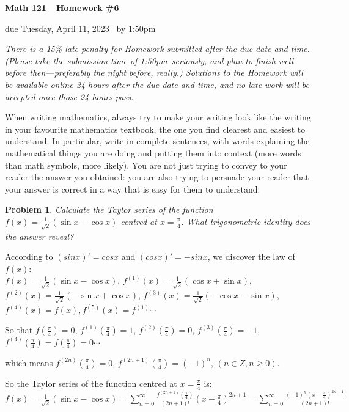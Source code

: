 \documentclass[12pt,reqno]{amsart}
\newtheorem{problem}{Problem}
\newcommand{\duetime}{1:50{\sc pm}}
\newcommand{\thisyear}{2023}
\begin{document}
\centerline{\bf Math 121---Homework \#6}
\centerline{due
	Tuesday, April 11, \thisyear
\ by \duetime}

\medskip
{\em There is a 15\% late penalty for Homework submitted after the due date and time. (Please take the submission time of \duetime\ seriously, and plan to finish well before then---preferably the night before, really.) Solutions to the Homework will be available online 24 hours after the due date and time, and no late work will be accepted once those 24 hours pass.}

\smallskip
When writing mathematics, always try to make your writing look like the writing in your favourite mathematics textbook, the one you find clearest and easiest to understand. In particular, write in complete sentences, with words explaining the mathematical things you are doing and putting them into context (more words than math symbols, more likely). You are not just trying to convey to your reader the answer you obtained: you are also trying to persuade your reader that your answer is correct in a way that is easy for them to understand.



\medskip
\begin{problem}
Calculate the Taylor series of the function $f(x) = \frac1{\sqrt2}(\sin x - \cos x)$ centred at $x=\frac\pi4$. What trigonometric identity does the answer reveal?
\end{problem}
According to $(sinx)'=cosx$ and $(cosx)'=-sinx$, we discover the law of $f(x)$:\\
$f(x)=\frac{1}{\sqrt{2}}(\sin x-\cos x)$, $f^{(1)}(x)=\frac{1}{\sqrt{2}}(\cos x+\sin x)$,
 $f^{(2)}(x)=\frac{1}{\sqrt{2}}(-\sin x+\cos x)$, $f^{(3)}(x)=\frac{1}{\sqrt{2}}(-\cos x-\sin x)$, $f^{(4)}(x)=f(x),f^{(5)}(x)=f^{(1)}\cdots$

So that $f(\frac{\pi}{4})=0$, $f^{(1)}(\frac{\pi}{4})=1$, $f^{(2)}(\frac{\pi}{4})=0$, $f^{(3)}(\frac{\pi}{4})=-1$, $f^{(4)}(\frac{\pi}{4})=f(\frac{\pi}{4})=0\cdots$

which means $f^{(2n)}(\frac{\pi}{4})=0$, $f^{(2n+1)}(\frac{\pi}{4})=(-1)^{n}$, $(n\in Z,n\geq0)$.

So the Taylor series of the function centred at $x=\frac{\pi}{4}$ is:
\\$f(x)=\frac{1}{\sqrt{2}}(\sin x-\cos x)=\sum\limits_{n=0}^{\infty}\frac{f^{(2n+1)}(\frac{\pi}{4})}{(2n+1)!}(x-\frac{\pi}{4})^{2n+1}= \sum\limits_{n=0}^{\infty}\frac{(-1)^n (x-\frac{\pi}{4})^{2n+1}}{(2n+1)!} $
\end{document}
